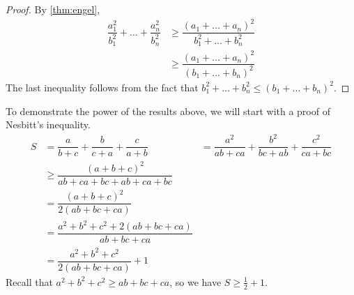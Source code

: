 \documentclass{subfile}
\begin{document}
		\begin{proof}
			By \autoref{thm:engel},
				\begin{align*}
					\dfrac{a_1^2}{b_1^2}+\ldots+\dfrac{a_n^2}{b_n^2}
						& \geq\dfrac{(a_1+\ldots+a_n)^2}{b_1^2+\ldots+b_n^2}\\
						& \geq\dfrac{(a_1+\ldots+a_n)^2}{(b_1+\ldots+b_n)^2}
				\end{align*}
			The last inequality follows from the fact that $b_1^2+\ldots+b_n^2\leq(b_1+\ldots+b_n)^2$.
		\end{proof}
	To demonstrate the power of the results above, we will start with a proof of Nesbitt's inequality.
		\begin{align*}
			S
				& = \dfrac{a}{b+c}+\dfrac{b}{c+a}+\dfrac{c}{a+b}
				& = \dfrac{a^2}{ab+ca}+\dfrac{b^2}{bc+ab}+\dfrac{c^2}{ca+bc}\\
				& \geq\dfrac{(a+b+c)^2}{ab+ca+bc+ab+ca+bc}\\
				& = \dfrac{(a+b+c)^2}{2(ab+bc+ca)}\\
				& = \dfrac{a^2+b^2+c^2+2(ab+bc+ca)}{ab+bc+ca}\\
				& = \dfrac{a^2+b^2+c^2}{2(ab+bc+ca)}+1
		\end{align*}
	Recall that $a^2+b^2+c^2\geq ab+bc+ca$, so we have $S\geq\frac{1}{2}+1$.
\end{document}
